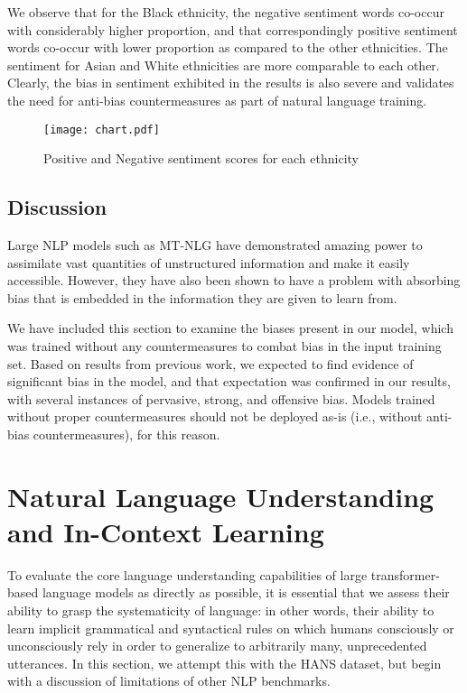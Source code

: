 \documentclass[11pt]{article}
\begin{document}
We observe that for the Black ethnicity, the negative sentiment words co-occur with considerably higher proportion, and that correspondingly positive sentiment words co-occur with lower proportion as compared to the other ethnicities. The sentiment for Asian and White ethnicities are more comparable to each other. Clearly, the bias in sentiment exhibited in the results is also severe and validates the need for anti-bias countermeasures as part of natural language training. 







\begin{figure}
    \centering
    \texttt{[image: chart.pdf]}
    \caption{Positive and Negative sentiment scores for each ethnicity }
    \label{fig:race_sentiment}
\end{figure}



















\subsection{Discussion}

Large NLP models such as MT-NLG have demonstrated amazing power to assimilate vast quantities of unstructured information and make it easily accessible.  However, they have also been shown to have a problem with absorbing bias that is embedded in the information they are given to learn from.   

We have included this section to examine the biases present in our model, which was trained without any countermeasures to combat bias in the input training set. Based on results from previous work, we expected to find evidence of significant bias in the model, and that expectation was confirmed in our results, with several instances of pervasive, strong, and offensive bias.  Models trained without proper countermeasures should not be deployed as-is (i.e., without anti-bias countermeasures), for this reason. 



\section{Natural Language Understanding and In-Context Learning}
\label{sec:hans}
To evaluate the core language understanding capabilities of large transformer-based language models as directly as possible, it is essential that we assess their ability to grasp the systematicity of language: in other words, their ability to learn implicit grammatical and syntactical rules on which humans consciously or unconsciously rely in order to generalize to arbitrarily many, unprecedented utterances.  In this section, we attempt this with the HANS dataset, but begin with a discussion of limitations of other NLP benchmarks.
\end{document}
